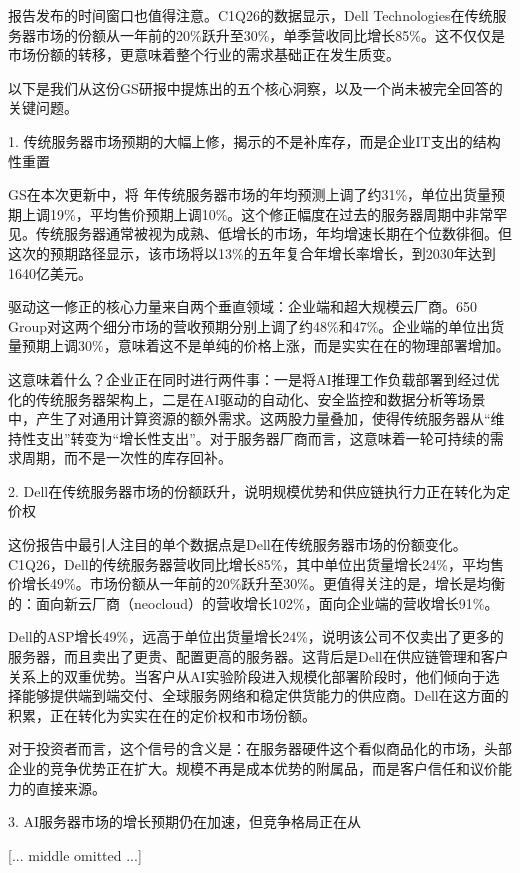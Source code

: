 \documentclass[11pt]{ctexart}
\begin{document}
报告发布的时间窗口也值得注意。C1Q26的数据显示，Dell Technologies在传统服务器市场的份额从一年前的20\%跃升至30\%，单季营收同比增长85\%。这不仅仅是市场份额的转移，更意味着整个行业的需求基础正在发生质变。

以下是我们从这份GS研报中提炼出的五个核心洞察，以及一个尚未被完全回答的关键问题。

1. 传统服务器市场预期的大幅上修，揭示的不是补库存，而是企业IT支出的结构性重置

GS在本次更新中，将 年传统服务器市场的年均预测上调了约31\%，单位出货量预期上调19\%，平均售价预期上调10\%。这个修正幅度在过去的服务器周期中非常罕见。传统服务器通常被视为成熟、低增长的市场，年均增速长期在个位数徘徊。但这次的预期路径显示，该市场将以13\%的五年复合年增长率增长，到2030年达到1640亿美元。

驱动这一修正的核心力量来自两个垂直领域：企业端和超大规模云厂商。650 Group对这两个细分市场的营收预期分别上调了约48\%和47\%。企业端的单位出货量预期上调30\%，意味着这不是单纯的价格上涨，而是实实在在的物理部署增加。

这意味着什么？企业正在同时进行两件事：一是将AI推理工作负载部署到经过优化的传统服务器架构上，二是在AI驱动的自动化、安全监控和数据分析等场景中，产生了对通用计算资源的额外需求。这两股力量叠加，使得传统服务器从“维持性支出”转变为“增长性支出”。对于服务器厂商而言，这意味着一轮可持续的需求周期，而不是一次性的库存回补。

2. Dell在传统服务器市场的份额跃升，说明规模优势和供应链执行力正在转化为定价权

这份报告中最引人注目的单个数据点是Dell在传统服务器市场的份额变化。C1Q26，Dell的传统服务器营收同比增长85\%，其中单位出货量增长24\%，平均售价增长49\%。市场份额从一年前的20\%跃升至30\%。更值得关注的是，增长是均衡的：面向新云厂商（neocloud）的营收增长102\%，面向企业端的营收增长91\%。

Dell的ASP增长49\%，远高于单位出货量增长24\%，说明该公司不仅卖出了更多的服务器，而且卖出了更贵、配置更高的服务器。这背后是Dell在供应链管理和客户关系上的双重优势。当客户从AI实验阶段进入规模化部署阶段时，他们倾向于选择能够提供端到端交付、全球服务网络和稳定供货能力的供应商。Dell在这方面的积累，正在转化为实实在在的定价权和市场份额。

对于投资者而言，这个信号的含义是：在服务器硬件这个看似商品化的市场，头部企业的竞争优势正在扩大。规模不再是成本优势的附属品，而是客户信任和议价能力的直接来源。

3. AI服务器市场的增长预期仍在加速，但竞争格局正在从

[... middle omitted ...]
\end{document}
